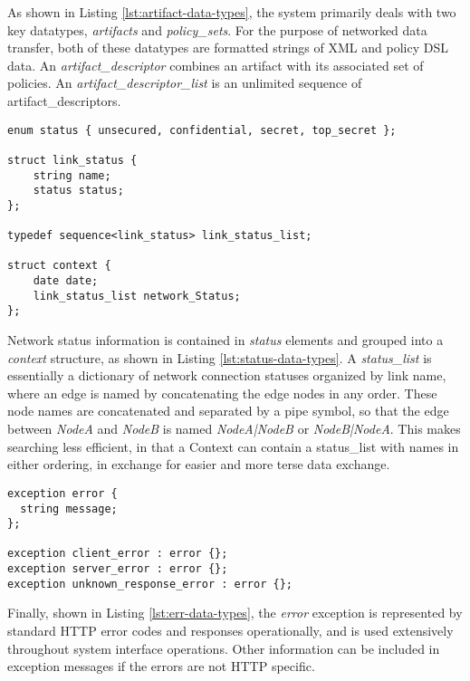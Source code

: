 As shown in Listing \ref{lst:artifact-data-types}, the system primarily deals with two key datatypes, \emph{artifacts} and \emph{policy\_sets}.  For the purpose of networked data transfer, both of these datatypes are formatted strings of XML and policy DSL data.  An \emph{artifact\_descriptor} combines an artifact with its associated set of policies.  An \emph{artifact\_descriptor\_list} is an unlimited sequence of artifact\_descriptors.

\begin{lstlisting}[language=idl, label=lst:status-data-types, caption=Key Status Dataypes]
enum status { unsecured, confidential, secret, top_secret };

struct link_status {
	string name;
	status status;
};

typedef sequence<link_status> link_status_list;

struct context {
	date date;
	link_status_list network_Status;
};
\end{lstlisting}

Network status information is contained in \emph{status} elements and grouped into a \emph{context} structure, as shown in Listing \ref{lst:status-data-types}.  A \emph{status\_list} is essentially a dictionary of network connection statuses organized by link name, where an edge is named by concatenating the edge nodes in any order.  These node names are concatenated and separated by a pipe symbol, so that the edge between \textit{NodeA} and \textit{NodeB} is named \textit{NodeA|NodeB} or \textit{NodeB|NodeA}.  This makes searching less efficient, in that a Context can contain a status\_list with names in either ordering, in exchange for easier and more terse data exchange.

\begin{lstlisting}[language=idl, label=lst:err-data-types, caption=Key Error Dataypes]
exception error {
  string message;
};

exception client_error : error {};
exception server_error : error {};
exception unknown_response_error : error {};
\end{lstlisting}

Finally, shown in Listing \ref{lst:err-data-types}, the \emph{error} exception is represented by standard HTTP error codes and responses operationally, and is used extensively throughout system interface operations.  Other information can be included in exception messages if the errors are not HTTP specific.

%


